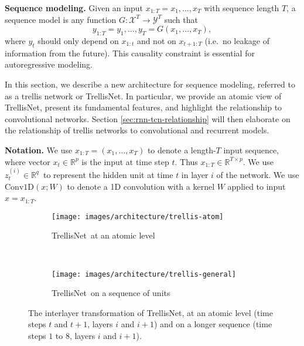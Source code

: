 \documentclass{article} \usepackage{iclr2019_conference,times}
\newcommand\mypara[1]{\vspace{0mm}\noindent\textbf{#1}}
\newcommand{\model}{TrellisNet}
\begin{document}
\mypara{Sequence modeling.}
Given an input $x_{1:T} = x_1, \dots, x_T$ with sequence length $T$, a sequence model is any function ${G: \mathcal{X}^T \rightarrow \mathcal{Y}^T}$ such that
\begin{equation}
y_{1:T} = y_1, \dots, y_T = G(x_1, \dots, x_T),
\end{equation}
where $y_t$ should only depend on $x_{1:t}$ and not on $x_{t+1:T}$ (i.e.\ no leakage of information from the future). This causality constraint is essential for autoregressive modeling.

In this section, we describe a new architecture for sequence modeling, referred to as a trellis network or TrellisNet. In particular, we provide an atomic view of \model, present its fundamental features, and highlight the relationship to convolutional networks. Section \ref{sec:rnn-tcn-relationship} will then elaborate on the relationship of trellis networks to convolutional and recurrent models.

\mypara{Notation.}
We use $x_{1:T}=(x_1, \dots, x_T)$ to denote a length-$T$ input sequence, where vector $x_t \in \mathbb{R}^p$ is the input at time step $t$. Thus $x_{1:T} \in \mathbb{R}^{T \times p}$. We use \small$z_t^{(i)} \in \mathbb{R}^q$\normalsize\ to represent the hidden unit at time $t$ in layer $i$ of the network. We use $\text{Conv1D}(x; W)$ to denote a 1D convolution with a kernel $W$ applied to input $x=x_{1:T}$.


\begin{figure}[t]
    \vspace{-.2in}
    \centering
    \begin{subfigure}[b]{.33\textwidth}
        \centering
        \texttt{[image: images/architecture/trellis-atom]}
        \caption{\model~at an atomic level}
        \label{fig:trellis-atom}
    \end{subfigure}
    ~
    \begin{subfigure}[b]{.59\textwidth}
        \centering
        \texttt{[image: images/architecture/trellis-general]}
        \caption{\model~on a sequence of units}
        \label{fig:trellis-general}
    \end{subfigure}
    \vspace{-1mm}
    \caption{The interlayer transformation of \model, at an atomic level (time steps $t$ and $t+1$, layers $i$ and $i+1$) and on a longer sequence (time steps $1$ to $8$, layers $i$ and $i+1$).}
    \label{fig:generic-trellis-network}
    \vspace{-3mm}
\end{figure}
\end{document}
